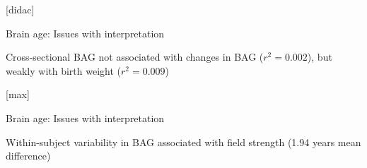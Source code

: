 \documentclass[9pt]{beamer}
\begin{document}
	[didac]
	\begin{frame}{Brain age: Issues with interpretation}
		\centering
		\vfill
		\vfill
        Cross-sectional BAG not associated with changes in BAG ($r^2=0.002$), but weakly with birth weight ($r^2=0.009$)
	\end{frame}

	[max]
	\begin{frame}{Brain age: Issues with interpretation}
		\centering
		\vfill
		\vfill
        Within-subject variability in BAG associated with field strength (1.94 years mean difference)
	\end{frame}
\end{document}
